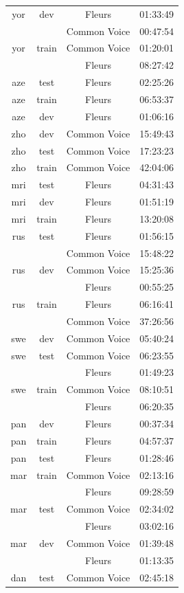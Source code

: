 \begin{longtable}{cccc}
yor & dev & Fleurs & 01:33:49 \\ 
 & & Common Voice & 00:47:54 \\ 
yor & train & Common Voice & 01:20:01 \\ 
 & & Fleurs & 08:27:42 \\ \midrule
aze & test & Fleurs & 02:25:26 \\ 
aze & train & Fleurs & 06:53:37 \\ 
aze & dev & Fleurs & 01:06:16 \\ \midrule
zho & dev & Common Voice & 15:49:43 \\ 
zho & test & Common Voice & 17:23:23 \\ 
zho & train & Common Voice & 42:04:06 \\ \midrule
mri & test & Fleurs & 04:31:43 \\ 
mri & dev & Fleurs & 01:51:19 \\ 
mri & train & Fleurs & 13:20:08 \\ \midrule
rus & test & Fleurs & 01:56:15 \\ 
 & & Common Voice & 15:48:22 \\ 
rus & dev & Common Voice & 15:25:36 \\ 
 & & Fleurs & 00:55:25 \\ 
rus & train & Fleurs & 06:16:41 \\ 
 & & Common Voice & 37:26:56 \\ \midrule
swe & dev & Common Voice & 05:40:24 \\ 
swe & test & Common Voice & 06:23:55 \\ 
 & & Fleurs & 01:49:23 \\ 
swe & train & Common Voice & 08:10:51 \\ 
 & & Fleurs & 06:20:35 \\ \midrule
pan & dev & Fleurs & 00:37:34 \\ 
pan & train & Fleurs & 04:57:37 \\ 
pan & test & Fleurs & 01:28:46 \\ \midrule
mar & train & Common Voice & 02:13:16 \\ 
 & & Fleurs & 09:28:59 \\ 
mar & test & Common Voice & 02:34:02 \\ 
 & & Fleurs & 03:02:16 \\ 
mar & dev & Common Voice & 01:39:48 \\ 
 & & Fleurs & 01:13:35 \\ \midrule
dan & test & Common Voice & 02:45:18 \\ 

\end{longtable}
